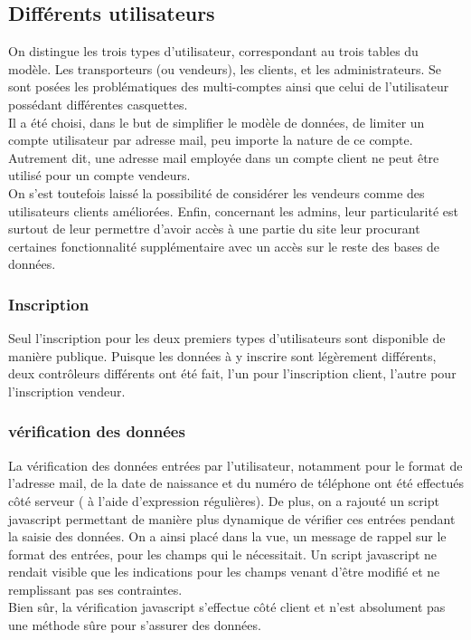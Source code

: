 \documentclass{article}
\begin{document}
\subsection{Différents utilisateurs} 
On distingue les trois types d'utilisateur, correspondant au trois tables du modèle. Les transporteurs (ou vendeurs), les clients, et les administrateurs.
Se sont posées les problématiques des multi-comptes ainsi que celui de l'utilisateur possédant différentes casquettes. 
\\
Il a été choisi, dans le but de simplifier le modèle de données, de limiter un compte utilisateur par adresse mail, peu importe la nature de ce compte. 
Autrement dit, une adresse mail employée dans un compte client ne peut être utilisé pour un compte vendeurs. 
\\
On s'est toutefois laissé la possibilité de considérer les vendeurs comme des utilisateurs clients améliorées. Enfin, concernant les admins, leur particularité est surtout de leur permettre d'avoir accès à une partie du site leur procurant certaines fonctionnalité supplémentaire avec un accès sur le reste des bases de données.

\subsubsection{Inscription}
Seul l'inscription pour les deux premiers types d'utilisateurs sont disponible de manière publique. Puisque les données à y inscrire sont légèrement différents, deux contrôleurs différents ont été fait, l'un pour l'inscription client, l'autre pour l'inscription vendeur. 
\subsubsection{vérification des données}
La vérification des données entrées par l'utilisateur, notamment pour le format de l'adresse mail, de la date de naissance et du numéro de téléphone ont été effectués côté serveur ( à l'aide d'expression régulières).  
De plus, on a rajouté un script javascript permettant de manière plus dynamique de vérifier ces entrées pendant la saisie des données. On a ainsi placé dans la vue, un message de rappel sur le format des entrées, pour les champs qui le nécessitait. Un script javascript ne rendait visible que les indications pour les champs venant d'être modifié et ne remplissant pas ses contraintes. 
\\
Bien sûr, la vérification javascript s'effectue côté client et n'est absolument pas une méthode sûre pour s'assurer des données. 
\end{document}
